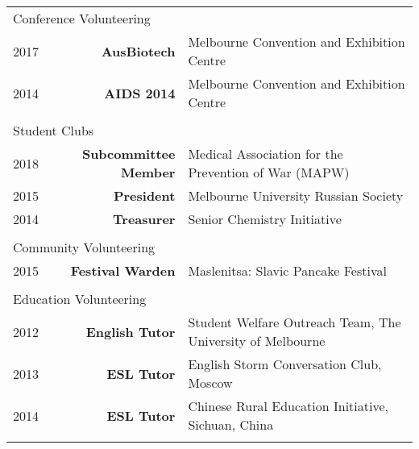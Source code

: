 \documentclass{article}
\begin{document}
\begin{tabularx}{\linewidth}{
							l
							>{\bfseries}r
							X}
	\multicolumn{2}{l}{\large{Conference Volunteering}} \\ \normalsize
		\hspace{0.3cm}	2017 & AusBiotech & Melbourne Convention and Exhibition Centre \\ 
		\hspace{0.3cm}	2014 & AIDS 2014 & Melbourne Convention and Exhibition Centre \\ \\
	\multicolumn{2}{l}{\large{Student Clubs}} \\ \normalsize 
		\hspace{0.3cm} 2018 & Subcommittee Member & Medical Association for the Prevention of War (MAPW) \\
		\hspace{0.3cm}	2015 & President & Melbourne University Russian Society\\
		\hspace{0.3cm}	2014 & Treasurer & Senior Chemistry Initiative \\ \\
	\multicolumn{2}{l}{\large{Community Volunteering}} \\
		\hspace{0.3cm}	2015 & Festival Warden & Maslenitsa: Slavic Pancake Festival \\	\\
	\multicolumn{2}{l}{\large{Education Volunteering}} \\
		\hspace{0.3cm}	2012 & English Tutor & Student Welfare Outreach Team, The University of Melbourne \\
		\hspace{0.3cm} 2013 & ESL Tutor & English Storm Conversation Club, Moscow \\
		\hspace{0.3cm} 2014 & ESL Tutor & Chinese Rural Education Initiative, Sichuan, China \\ \\
	
\end{tabularx}
\end{document}
